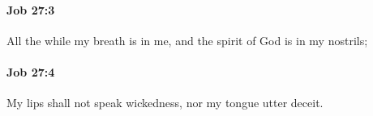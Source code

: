 		\paragraph{Job 27:3} %
			\label{JOB-27-3}

			All the while my breath is in me, and the spirit of God is in my nostrils;


		\paragraph{Job 27:4} %
			\label{JOB-27-4}

			My lips shall not speak wickedness, nor my tongue utter deceit.


